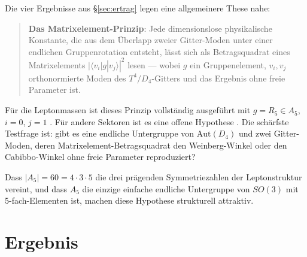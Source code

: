 Die vier Ergebnisse aus §\ref{sec:ertrag} legen eine allgemeinere These nahe:

\begin{quote}
\textbf{Das Matrixelement-Prinzip}: Jede dimensionslose physikalische Konstante,
die aus dem Überlapp zweier Gitter-Moden unter einer endlichen Gruppenrotation
entsteht, lässt sich als Betragsquadrat eines Matrixelements $|\langle v_i|g|v_j\rangle|^2$
lesen --- wobei $g$ ein Gruppenelement, $v_i, v_j$ orthonormierte Moden des
$T^4/D_4$-Gitters und das Ergebnis ohne freie Parameter ist.
\end{quote}

Für die Leptonmassen ist dieses Prinzip vollständig ausgeführt mit
$g = R_5 \in A_5$, $i=0$, $j=1$ \BM. Für andere Sektoren ist es eine offene
Hypothese \SM. Die schärfste Testfrage ist: gibt es eine endliche Untergruppe
von $\mathrm{Aut}(D_4)$ und zwei Gitter-Moden, deren Matrixelement-Betrags\-quadrat
den Weinberg-Winkel oder den Cabibbo-Winkel ohne freie Parameter reproduziert?

Dass $|A_5|= 60 = 4 \cdot 3 \cdot 5$ die drei prägenden Symmetriezahlen der
Leptonstruktur vereint, und dass $A_5$ die einzige einfache endliche Untergruppe
von $SO(3)$ mit 5-fach-Elementen ist, machen diese Hypothese strukturell
attraktiv.

\section{Ergebnis}

